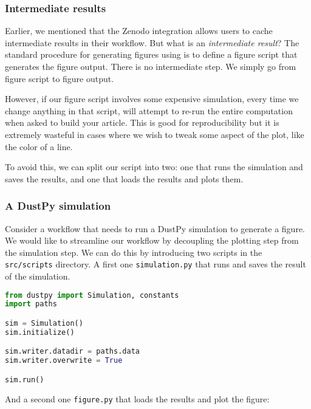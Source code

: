 \documentclass{aa}
\begin{document}
\subsubsection{Intermediate results}

Earlier, we mentioned that the Zenodo integration allows users to cache intermediate results in their workflow.
But what is an \textit{intermediate result}?
The standard procedure for generating figures using \showyourwork is to define a figure script that generates the figure output.
There is no intermediate step. We simply go from figure script to figure output.

However, if our figure script involves some expensive simulation, every time we change anything in that script, \showyourwork will attempt to re-run the entire computation when asked to build your article.
This is good for reproducibility but it is extremely wasteful in cases where we wish to tweak some aspect of the plot, like the color of a line.

To avoid this, we can split our script into two: one that runs the simulation and saves the results, and one that loads the results and plots them.

\subsubsection{A DustPy simulation}

Consider a workflow that needs to run a DustPy simulation to generate a figure.
We would like to streamline our workflow by decoupling the plotting step from the simulation step.
We can do this by introducing two scripts in the \texttt{src/scripts} directory.
A first one \texttt{simulation.py} that runs and saves the result of the simulation. 

\begin{lstlisting}[language=python, caption=simulations.py]
from dustpy import Simulation, constants
import paths

sim = Simulation()
sim.initialize()

sim.writer.datadir = paths.data
sim.writer.overwrite = True

sim.run()
\end{lstlisting}

And a second one \texttt{figure.py} that loads the results and plot the figure:
\end{document}

